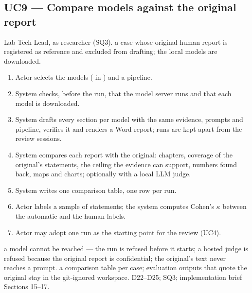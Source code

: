 \subsection{UC9 --- Compare models against the original report\added}
 Lab Tech Lead, as researcher (SQ3).
 a case whose original human report is registered as reference and excluded from drafting; the local models are downloaded.
\begin{enumerate}
\item Actor selects the models (\code{[selection]} in ) and a pipeline.
\item System checks, before the run, that the model server runs and that each model is downloaded.
\item System drafts every section per model with the same evidence, prompts and pipeline, verifies it and renders a Word report; runs are kept apart from the review sessions.
\item System compares each report with the original: chapters, coverage of the original's statements, the ceiling the evidence can support, numbers found back, maps and charts; optionally with a local LLM judge.
\item System writes one comparison table, one row per run.
\item Actor labels a sample of statements; the system computes Cohen's $\kappa$ between the automatic and the human labels.
\item Actor may adopt one run as the starting point for the review (UC4).
\end{enumerate}
 a model cannot be reached --- the run is refused before it starts; a hosted judge is refused because the original report is confidential; the original's text never reaches a prompt.
 a comparison table per case; evaluation outputs that quote the original stay in the git-ignored workspace.
 D22--D25; SQ3; implementation brief Sections 15--17.

